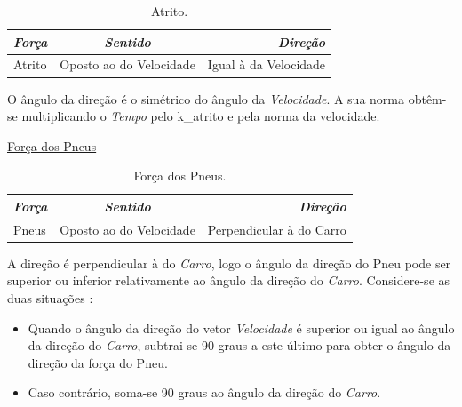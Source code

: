 \documentclass[a4paper]{report} %
\begin{document}
\begin{table}[!h]
\begin{center}
\begin{tabular}{|l|c|r|}
    
    \hline
  \emph{Força} & \emph{Sentido} & \emph{Direção} \\
    \hline
  Atrito & Oposto ao do Velocidade & Igual à da Velocidade \\
    \hline

\end{tabular}
\end{center}
\caption{Atrito.}
\end{table}

O ângulo da direção é o simétrico do ângulo da \emph{Velocidade}. A sua norma obtêm-se multiplicando o \emph{Tempo} pelo k_atrito e pela norma da velocidade.

\maketitle\underline{Força dos Pneus}

\begin{table}[!h]
\begin{center}
\begin{tabular}{|l|c|r|}
    
    \hline
  \emph{Força} & \emph{Sentido} & \emph{Direção} \\
    \hline
  Pneus & Oposto ao do Velocidade & Perpendicular à do Carro \\
    \hline

\end{tabular}
\end{center}
\caption{Força dos Pneus.}
\end{table} 

A direção é perpendicular à do \emph{Carro}, logo o ângulo da direção do Pneu pode ser superior ou inferior relativamente ao ângulo da direção do \emph{Carro}.
Considere-se as duas situações :

\begin{itemize}
   
   \item Quando o ângulo da direção do vetor \emph{Velocidade} é superior ou igual ao ângulo da direção do \emph{Carro}, subtrai-se 90 graus a este último para obter o ângulo da direção da força do Pneu.
   \item Caso contrário, soma-se 90 graus ao ângulo da direção do \emph{Carro}.

\end{itemize}
\end{document}
